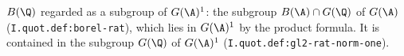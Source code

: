 $B(\Q)$ regarded as a subgroup of $G(\A)^1$: the subgroup $B(\A)\cap G(\Q)$ of $G(\A)$ (\texttt{I.quot.def:borel-rat}), which lies in $G(\A)^1$ by the
product formula. It is contained in the subgroup $G(\Q)$ of $G(\A)^1$ (\texttt{I.quot.def:gl2-rat-norm-one}).
